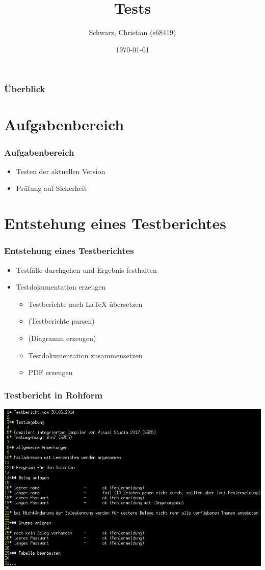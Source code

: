 \documentclass{beamer}
\title[Tests]{Tests}
\author{Schwarz, Christian (s68419)}
\date{\today}
\begin{document}
\begin{frame}
  \titlepage
\end{frame}

\begin{frame}
  \frametitle{Überblick}
  \tableofcontents
\end{frame}

\section{Aufgabenbereich}

\begin{frame}
  \frametitle{Aufgabenbereich}
  \begin{itemize}
  \item Testen der aktuellen Version
  \item Prüfung auf Sicherheit
  \end{itemize}
\end{frame}

\section{Entstehung eines Testberichtes}
\begin{frame}
  \frametitle{Entstehung eines Testberichtes}
  \begin{itemize}
  \item Testfälle durchgehen und Ergebnis festhalten
  \item Testdokumentation erzeugen
    \begin{itemize}
    \item Testberichte nach LaTeX übersetzen
    \item (Testberichte parsen)
    \item (Diagramm erzeugen)
    \item Testdokumentation zusammensetzen
    \item PDF erzeugen
    \end{itemize}
  \end{itemize}
\end{frame}

\begin{frame}
  \frametitle{Testbericht in Rohform}
  \includegraphics[width=\textwidth]{bericht.png}
\end{frame}
\end{document}
